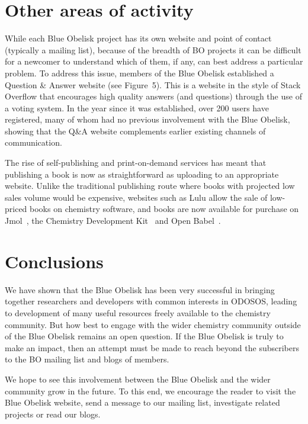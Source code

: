 \documentclass[10pt]{bmc_article}
\newenvironment{bmcformat}{\fussy\setboolean{publ}{true}}{\fussy}
\begin{document}
\begin{bmcformat}
\section*{Other areas of activity}

While each Blue Obelisk project has its own website and point of
contact (typically a mailing list), because of the breadth of BO
projects it can be difficult for a newcomer to understand which of
them, if any, can best address a particular problem. To address this
issue, members of the Blue Obelisk established a Question \& Answer
website\cite{WebBOShapado} (see Figure~5).  This is a website in the
style of Stack Overflow\cite{WebStackOverflow} that encourages high quality answers (and
questions) through the use of a voting system. In the year since it
was established, over 200 users have registered, many of whom had no
previous involvement with the Blue Obelisk, showing that the Q\&A
website complements earlier existing channels of communication.

The rise of self-publishing and print-on-demand services has meant
that publishing a book is now as straightforward as uploading to an
appropriate website. Unlike the traditional publishing route where
books with projected low sales volume would be expensive,
websites such as Lulu\cite{WebLulu} allow the sale of low-priced books on
chemistry software, and books are now available for purchase
on Jmol~\cite{JmolBook}, the Chemistry Development Kit~\cite{CDKBook}
and Open Babel~\cite{Open BabelBook}.

\section*{Conclusions}

We have shown that the Blue Obelisk has been very successful
in bringing together researchers and developers with common interests
in ODOSOS, leading to development of many useful resources freely
available to the chemistry community. But how best to engage with the
wider chemistry community outside of the Blue Obelisk remains an open
question. If the Blue Obelisk is truly to make an impact,
then an attempt must be made to reach beyond the subscribers to the
BO mailing list and blogs of members.

We hope to see this involvement between the Blue Obelisk and the wider
community grow in the future. To this end, we encourage the reader to
visit the Blue Obelisk website\cite{WebBlueObelisk}, send a message to our mailing list,
investigate related projects or read our blogs.



\end{bmcformat}
\end{document}
